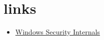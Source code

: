 \section{links}

\begin{itemize}
    \item \href{hhttps://www.google.fr/books/edition/Windows_Security_Internals/b_fNEAAAQBAJ?hl=fr&gbpv=1&dq=windows%20security%20internals&pg=PA25&printsec=frontcover}{Windows Security Internals}
\end{itemize}
